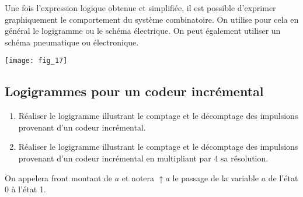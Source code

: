 Une fois l'expression logique obtenue et simplifiée, il est possible d'exprimer graphiquement le comportement du système combinatoire. On utilise pour cela en général le logigramme ou le schéma électrique. On peut également utiliser un schéma pneumatique ou électronique.




\begin{center}
\texttt{[image: fig\_17]}
\end{center}


\subsection{Logigrammes pour un codeur incrémental}
\begin{exemple}
\begin{enumerate}
\item Réaliser le logigramme illustrant le comptage et le décomptage des impulsions provenant d'un codeur incrémental.
\item Réaliser le logigramme illustrant le comptage et le décomptage des impulsions provenant d'un codeur incrémental en multipliant par 4 sa résolution.
\end{enumerate}

\begin{rem}
On appelera front montant de $a$ et notera $\uparrow a$  le passage de la variable $a$ de l'état 0 à l'état 1.
\end{rem}

\end{exemple}

\begin{thebibliography}{2}

\end{thebibliography}






